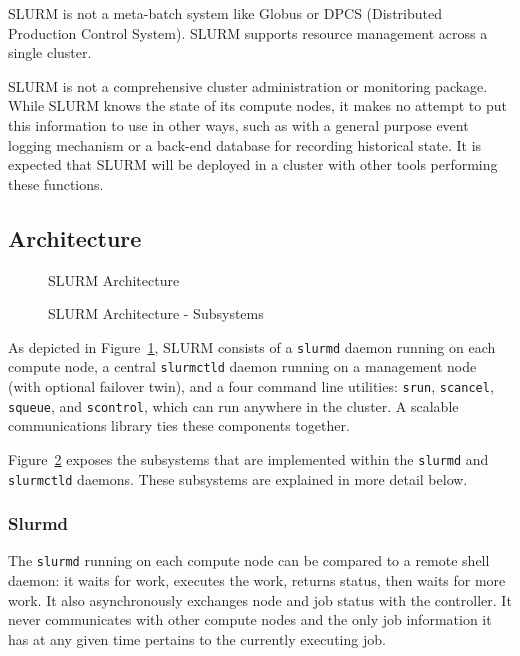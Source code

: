SLURM is not a meta-batch system like Globus or DPCS (Distributed Production 
Control System).  SLURM supports resource management across a single cluster.

SLURM is not a comprehensive cluster administration or monitoring package.  
While SLURM knows the state of its compute nodes, it makes no attempt to put
this information to use in other ways, such as with a general purpose event
logging mechanism or a back-end database for recording historical state.
It is expected that SLURM will be deployed in a cluster with other 
tools performing these functions. 

\subsection{Architecture}

\begin{figure}[htb]
\centerline{}
\caption{SLURM Architecture}
\label{arch}
\end{figure}

\begin{figure}[htb]
\centerline{}
\caption{SLURM Architecture - Subsystems}
\label{archdetail}
\end{figure}


As depicted in Figure~\ref{arch}, SLURM consists of a {\tt slurmd} daemon
running on each compute node, a central {\tt slurmctld} daemon running on
a management node (with optional failover twin), and a four command line
utilities: {\tt srun}, {\tt scancel}, {\tt squeue}, and {\tt scontrol},
which can run anywhere in the cluster.  A scalable communications library
ties these components together.

Figure~\ref{archdetail} exposes the subsystems that are implemented
within the {\tt slurmd} and {\tt slurmctld} daemons.  These subsystems
are explained in more detail below.

\subsubsection{Slurmd}

The {\tt slurmd} running on each compute node can be compared to a remote
shell daemon:  it waits for work, executes the work, returns status,
then waits for more work.  It also asynchronously exchanges node and job
status with the controller.  It never communicates with other compute
nodes and the only job information it has at any given time pertains to
the currently executing job.

